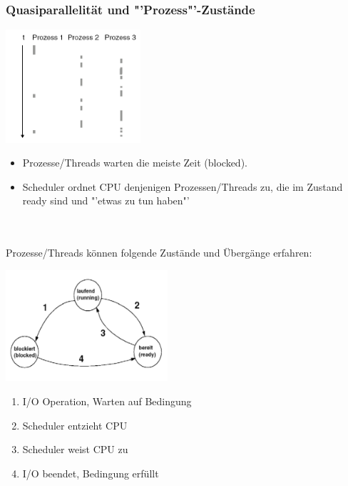 \subsubsection{Quasiparallelität und "'Prozess"'-Zustände}
\begin{minipage}[c]{8cm}
  \includegraphics[width=5cm]{images/Concurrency/Quasiparallelitaet.png}
\end{minipage}
\begin{minipage}[c]{10cm}
  \begin{itemize}
    \item Prozesse/Threads warten die meiste Zeit (blocked).
    \item Scheduler ordnet CPU denjenigen Prozessen/Threads zu, die im Zustand ready sind und "'etwas zu tun haben"'
  \end{itemize}
\end{minipage}\\\\
Prozesse/Threads können folgende Zustände und Übergänge erfahren:\\
\begin{minipage}[c]{8cm}
  \includegraphics[width=6cm]{images/Concurrency/Prozesszustaende.png}
\end{minipage}
\begin{minipage}[c]{10cm}
  \begin{enumerate}
    \item I/O Operation, Warten auf Bedingung
    \item Scheduler entzieht CPU
    \item Scheduler weist CPU zu
    \item I/O beendet, Bedingung erfüllt
  \end{enumerate}
\end{minipage}

